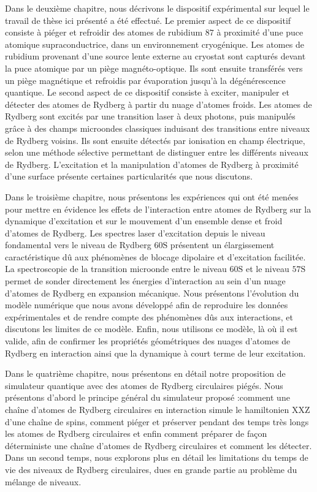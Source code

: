 Dans le deuxième chapitre, nous décrivons le dispositif expérimental sur lequel le travail de thèse ici présenté a été effectué.
Le premier aspect de ce dispositif consiste à piéger et refroidir des atomes de rubidium $87$ à proximité d'une puce atomique supraconductrice, dans un environnement cryogénique.
Les atomes de rubidium provenant d'une source lente externe au cryostat sont capturés devant la puce atomique par un piège magnéto-optique.
Ils sont ensuite transférés vers un piège magnétique et refroidis par évaporation jusqu'à la dégénérescence quantique.
Le second aspect de ce dispositif consiste à exciter, manipuler et détecter des atomes de Rydberg à partir du nuage d'atomes froids.
Les atomes de Rydberg sont excités par une transition laser à deux photons, puis manipulés grâce à des champs microondes classiques induisant des transitions entre niveaux de Rydberg voisins.
Ils sont ensuite détectés par ionisation en champ électrique, selon une méthode sélective permettant de distinguer entre les différents niveaux de Rydberg.
L'excitation et la manipulation d'atomes de Rydberg à proximité d'une surface présente certaines particularités que nous discutons.

Dans le troisième chapitre, nous présentons les expériences qui ont été menées pour mettre en évidence les effets de l'interaction entre atomes de Rydberg sur la dynamique d'excitation et sur le mouvement d'un ensemble dense et froid d'atomes de Rydberg.
Les spectres laser d'excitation depuis le niveau fondamental vers le niveau de Rydberg $\mathrm{60S}$ présentent un élargissement caractéristique dû aux phénomènes de blocage dipolaire et d'excitation facilitée.
La spectroscopie de la transition microonde entre le niveau $\mathrm{60S}$ et le niveau $\mathrm{57S}$ permet de sonder directement les énergies d'interaction au sein d'un nuage d'atomes de Rydberg en expansion mécanique.
Nous présentons l'évolution du modèle numérique que nous avons développé afin de reproduire les données expérimentales et de rendre compte des phénomènes dûs aux interactions, et discutons les limites de ce modèle.
Enfin, nous utilisons ce modèle, là où il est valide, afin de confirmer les propriétés géométriques des nuages d'atomes de Rydberg en interaction ainsi que la dynamique à court terme de leur excitation.

Dans le quatrième chapitre, nous présentons en détail notre proposition de simulateur quantique avec des atomes de Rydberg circulaires piégés.
Nous présentons d'abord le principe général du simulateur proposé :comment une chaîne d'atomes de Rydberg circulaires en interaction simule le hamiltonien \og XXZ \fg{} d'une chaîne de spins, comment piéger et préserver pendant des temps très longs les atomes de Rydberg circulaires et enfin  comment préparer de façon déterministe une chaîne d'atomes de Rydberg circulaires et comment les détecter.
Dans un second temps, nous explorons plus en détail les limitations du temps de vie des niveaux de Rydberg circulaires, dues en grande partie au problème du mélange de niveaux.

